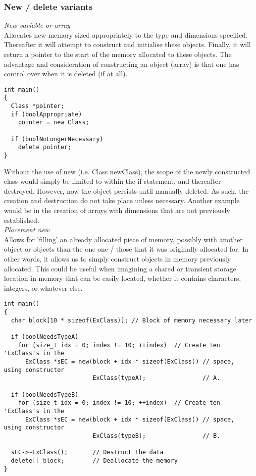 \subsubsection*{New / delete variants}
\textit{New variable or array} \\
Allocates new memory sized appropriately to the type and dimensions specified. Thereafter it will attempt to construct and initialise these objects. Finally, it will return a pointer to the start of the memory allocated to these objects. The advantage and consideration of constructing an object (array) is that one has control over when it is deleted (if at all).

\begin{lstlisting}[style=inline]
int main()
{
  Class *pointer;
  if (boolAppropriate)
    pointer = new Class;

  if (boolNoLongerNecessary)
    delete pointer;
}
\end{lstlisting}

Without the use of new (i.e. Class newClass), the scope of the newly constructed class would simply be limited to within the if statement, and thereafter destroyed. However, now the object persists until manually deleted. As such, the creation and destruction do not take place unless necessary. Another example would be in the creation of arrays with dimensions that are not previously established. \\

\textit{Placement new} \\
Allows for 'filling' an already allocated piece of memory, possibly with another object or objects than the one one / those that it was originally allocated for. In other words, it allows us to simply construct objects in memory previously allocated. This could be useful when imagining a shared or transient storage location in memory that can be easily located, whether it contains characters, integers, or whatever else.

\begin{lstlisting}[style=inline]
int main()
{
  char block[10 * sizeof(ExClass)]; // Block of memory necessary later

  if (boolNeedsTypeA)
    for (size_t idx = 0; index != 10; ++index)  // Create ten 'ExClass's in the
      ExClass *sEC = new(block + idx * sizeof(ExClass)) // space, using constructor
                         ExClass(typeA);                // A.

  if (boolNeedsTypeB)
    for (size_t idx = 0; index != 10; ++index)  // Create ten 'ExClass's in the
      ExClass *sEC = new(block + idx * sizeof(ExClass)) // space, using constructor
                         ExClass(typeB);                // B.

  sEC->~ExClass();       // Destruct the data
  delete[] block;        // Deallocate the memory
}
\end{lstlisting}

